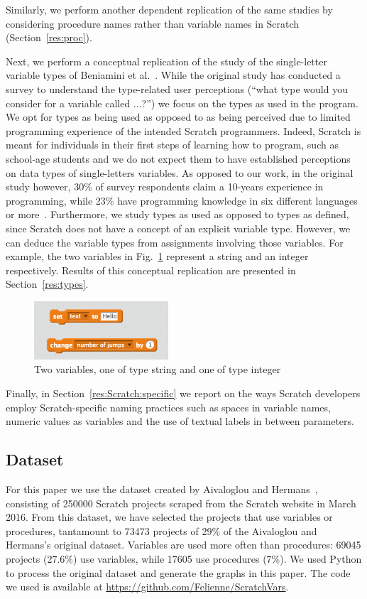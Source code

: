 \documentclass[conference]{IEEEtran}
\begin{document}
Similarly, we perform another dependent replication of the same studies by considering procedure names rather than variable names in Scratch (Section~\ref{res:proc}).

Next, we perform a conceptual replication of the study of the single-letter variable types of Beniamini et al.~\cite{Beniamini}. 
While the original study has conducted a survey to understand the type-related user perceptions (``what type would you consider for a variable called ...?'') we focus on the types as used in the program. 
We opt for types as being used as opposed to as being perceived due to limited programming experience of the intended Scratch programmers.
Indeed, Scratch is meant for individuals in their first steps of learning how to program, such as school-age students and we do not expect them to have established  perceptions on data types of single-letters variables. 
As opposed to our work, in the original study however, 30\% of survey respondents claim a 10-years experience in programming, while  23\% have programming knowledge in six different languages or more~\cite{Beniamini}. 
Furthermore, we study types as used as opposed to types as defined, since Scratch does not have a concept of an explicit variable type.
However, we can deduce the variable types from assignments involving those variables. 
For example, the two variables in Fig.~\ref{fig:types} represent a string and an integer respectively. 
Results of this conceptual replication are presented in Section~\ref{res:types}.

\begin{figure}
	\begin{center}
		\includegraphics[width=5cm]{fig/types}
		\caption{Two variables, one of type string and one of type integer}
		\label{fig:types}
	\end{center}
\end{figure} 

Finally, in Section~\ref{res:Scratch:specific} we report on the ways Scratch developers employ Scratch-specific naming practices such as spaces in variable names, numeric values as variables and the use of textual labels in between parameters.

\subsection{Dataset}
For this paper we use the dataset created by Aivaloglou and Hermans~\cite{Aivaloglou2016HowKC}, consisting of 250000 Scratch projects scraped from the Scratch website in March 2016. 
From this dataset, we have selected the projects that use variables or procedures, tantamount to 73473 projects of 29\% of the Aivaloglou and Hermans's original dataset. 
Variables are used more often than procedures: 69045 projects (27.6\%) use variables, while 17605 use procedures (7\%). 
We used Python to process the original dataset and generate the graphs in this paper. 
The code we used is available at \url{https://github.com/Felienne/ScratchVars}.
\end{document}
